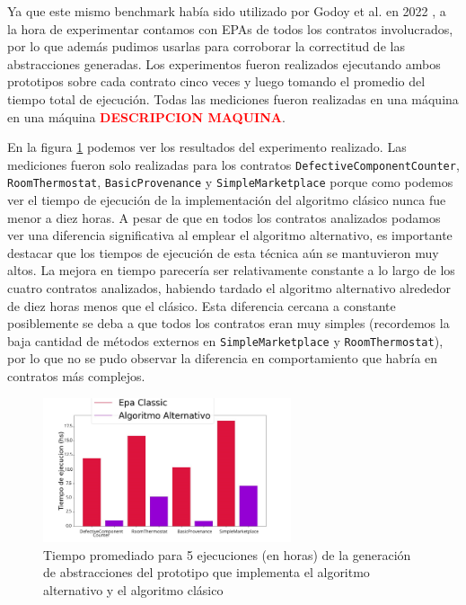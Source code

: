 Ya que este mismo benchmark había sido utilizado por Godoy et al. en 2022 \cite{predicate-abstraction-for-smart-contract-validation}, a la hora de experimentar contamos con EPAs de todos los contratos involucrados, por lo que además pudimos usarlas para corroborar la correctitud de las abstracciones generadas.
Los experimentos fueron realizados ejecutando ambos prototipos sobre cada contrato cinco veces y luego tomando el promedio del tiempo total de ejecución.
Todas las mediciones fueron realizadas en una máquina en una máquina \textcolor{red}{\textbf{DESCRIPCION MAQUINA}}.

En la figura \ref{fig:classic-vs-alternativo} podemos ver los resultados del experimento realizado.
Las mediciones fueron solo realizadas para los contratos \texttt{DefectiveComponentCounter}, \texttt{RoomThermostat}, \texttt{BasicProvenance} y \texttt{SimpleMarketplace} porque como podemos ver el tiempo de ejecución de la implementación del algoritmo clásico nunca fue menor a diez horas.
A pesar de que en todos los contratos analizados podamos ver una diferencia significativa al emplear el algoritmo alternativo, es importante destacar que los tiempos de ejecución de esta técnica aún se mantuvieron muy altos.
La mejora en tiempo parecería ser relativamente constante a lo largo de los cuatro contratos analizados, habiendo tardado el algoritmo alternativo alrededor de diez horas menos que el clásico.
Esta diferencia cercana a constante posiblemente se deba a que todos los contratos eran muy simples (recordemos la baja cantidad de métodos externos en \texttt{SimpleMarketplace} y \texttt{RoomThermostat}), por lo que no se pudo observar la diferencia en comportamiento que habría en contratos más complejos.

\begin{figure}[h]
    \centering
    \includegraphics[width=0.65\textwidth]{figs/classic_vs_alternativo.png}
    \caption{Tiempo promediado para 5 ejecuciones (en horas) de la generación de abstracciones del prototipo que implementa el algoritmo alternativo y el algoritmo clásico}
    \label{fig:classic-vs-alternativo}
\end{figure}

